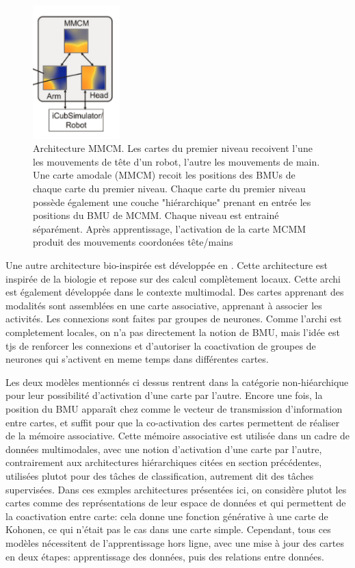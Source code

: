 \documentclass[../main]{subfiles}
\begin{document}
\begin{figure}
    \centering
    \includegraphics[width=0.3\textwidth]{MMCM_schema.pdf}
    \caption{Architecture MMCM. Les cartes du premier niveau recoivent l'une les mouvements de tête d'un robot, l'autre les mouvements de main. 
    Une carte amodale (MMCM) recoit les positions des BMUs de chaque carte du premier niveau. Chaque carte du premier niveau possède également une couche "hiérarchique" prenant en entrée les positions du BMU de MCMM. Chaque niveau est entrainé séparément.
    Après apprentissage, l'activation de la carte MCMM produit des mouvements coordonées tête/mains~\cite{dominey13}\label{fig:mmcm}}
\end{figure}


Une autre architecture bio-inspirée est développée en \cite{menard05}. Cette architecture est inspirée de la biologie et repose sur des calcul complètement locaux. Cette archi est également développée dans le contexte multimodal. Des cartes apprenant des modalités sont assemblées en une carte associative, apprenant à associer les activités. Les connexions sont faites par groupes de neurones. Comme l'archi est completement locales, on n'a pas directement la notion de BMU, mais l'idée est tjs de renforcer les connexions et d'autoriser la coactivation de groupes de neurones qui s'activent en meme temps dans différentes cartes.



Les deux modèles mentionnés ci dessus rentrent dans la catégorie non-hiéarchique pour leur possibilité d'activation d'une carte par l'autre. Encore une fois, la position du BMU apparaît chez \cite{dominey13} comme le vecteur de transmission d'information  entre cartes, et suffit pour que la co-activation des cartes permettent de réaliser de la mémoire associative.
Cette mémoire associative est utilisée dans un cadre de données multimodales, avec une notion d'activation d'une carte par l'autre, contrairement aux architectures hiérarchiques citées en section précédentes, utilisées plutot pour des tâches de classification, autrement dit des tâches supervisées.
Dans ces exmples architectures présentées ici, on considère plutot les cartes comme des représentations de leur espace de données et qui permettent de la coactivation entre carte: cela donne une fonction générative à une carte de Kohonen, ce qui n'était pas le cas dans une carte simple.
Cependant, tous ces modèles nécessitent de l'apprentissage hors ligne, avec une mise à jour des cartes en deux étapes: apprentissage des données, puis des relations entre données.
\end{document}
